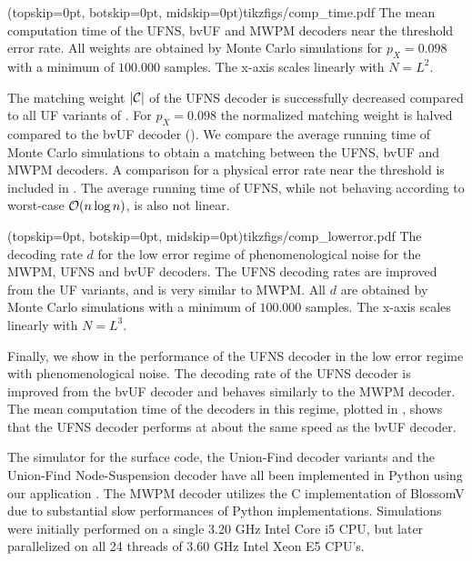 \Figure[b!](topskip=0pt, botskip=0pt, midskip=0pt){tikzfigs/comp_time.pdf}{
  The mean computation time of the UFNS, bvUF and MWPM decoders near the threshold error rate. All weights are obtained by Monte Carlo simulations for $p_X=0.098$ with a minimum of $100.000$ samples. The x-axis scales linearly with $N = L^2$.\label{comp_time}}

The matching weight $\lvert\mathcal{C}\rvert$ of the UFNS decoder is successfully decreased compared to all UF variants of . For $p_X = 0.098$ the normalized matching weight is halved compared to the bvUF decoder (). We compare the average running time of Monte Carlo simulations to obtain a matching between the UFNS, bvUF and MWPM decoders. A comparison for a physical error rate near the threshold is included in . The average running time of UFNS, while not behaving according to worst-case $\mathcal{O}(n \log{n})$, is also not linear. 

\Figure[tbh](topskip=0pt, botskip=0pt, midskip=0pt){tikzfigs/comp_lowerror.pdf}{
  The decoding rate $d$ for the low error regime of phenomenological noise for the MWPM, UFNS and bvUF decoders. The UFNS decoding rates are improved from the UF variants, and is very similar to MWPM. All $d$ are obtained by Monte Carlo simulations with a minimum of $100.000$ samples. The x-axis scales linearly with $N = L^3$.\label{comp_lowerror}}

Finally, we show in  the performance of the UFNS decoder in the low error regime with phenomenological noise. The decoding rate of the UFNS decoder is improved from the bvUF decoder and behaves similarly to the MWPM decoder. The mean computation time of the decoders in this regime, plotted in , shows that the UFNS decoder performs at about the same speed as the bvUF decoder.\par

The simulator for the surface code, the Union-Find decoder variants and the Union-Find Node-Suspension decoder have all been implemented in Python using our application \cite{OpenSurfaceSim}. The MWPM decoder utilizes the C implementation of BlossomV \cite{kolmogorov2009blossom} due to substantial slow performances of Python implementations. Simulations were initially performed on a single 3.20 GHz Intel Core i5 CPU, but later parallelized on all 24 threads of 3.60 GHz Intel Xeon E5 CPU's. 
